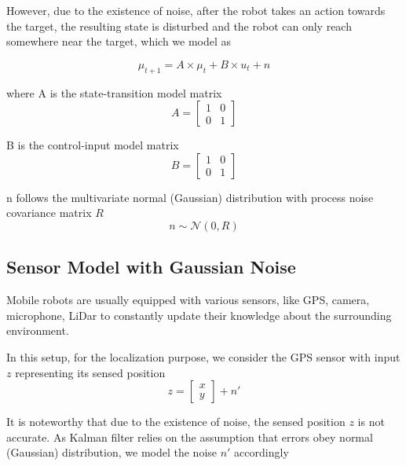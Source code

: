 \documentclass[conference,onecolumn]{IEEEtran}
\begin{document}
However, due to the existence of noise, after the robot takes an action towards the target, the resulting state is disturbed and the robot can only reach somewhere near the target, which we model as 

\begin{equation}
    \mu_{t+1} = A \times \mu_t + B \times u_t + n
\end{equation}

where A is the state-transition model matrix
\begin{equation}
    A = \begin{bmatrix} 
    1 & 0 \\
    0 & 1
    \end{bmatrix}
\end{equation}

B is the control-input model matrix
\begin{equation}
    B = \begin{bmatrix} 
    1 & 0 \\
    0 & 1
    \end{bmatrix}
\end{equation}

n follows the multivariate normal (Gaussian) distribution with process noise covariance matrix $R$
\begin{equation}
    n \sim \mathcal{N}\left(0, R\right)
\end{equation}

\subsection{Sensor Model with Gaussian Noise}
Mobile robots are usually equipped with various sensors, like GPS, camera, microphone, LiDar to constantly update their knowledge about the surrounding environment.

In this setup, for the localization purpose, we consider the GPS sensor with input $z$ representing its sensed position
\begin{equation}
    z = \begin{bmatrix} 
    x \\
    y
    \end{bmatrix} + n'
\end{equation}

It is noteworthy that due to the existence of noise, the sensed position $z$ is not accurate. As Kalman filter relies on the assumption that errors obey normal (Gaussian) distribution, we model the noise $n'$ accordingly
\end{document}
